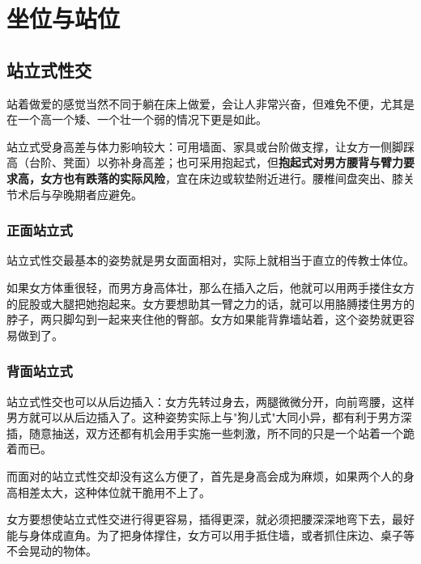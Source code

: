 \documentclass[12pt,UTF8]{ctexbook}
\begin{document}
\vspace{0.5em}
\section{坐位与站位}

\vspace{0.5em}
\subsection{站立式性交}

站着做爱的感觉当然不同于躺在床上做爱，会让人非常兴奋，但难免不便，尤其是在一个高一个矮、一个壮一个弱的情况下更是如此。

\vspace{0.5em}

站立式受身高差与体力影响较大：可用墙面、家具或台阶做支撑，让女方一侧脚踩高（台阶、凳面）以弥补身高差；也可采用抱起式，但\textbf{抱起式对男方腰背与臂力要求高，女方也有跌落的实际风险}，宜在床边或软垫附近进行。腰椎间盘突出、膝关节术后与孕晚期者应避免。

\subsubsection{正面站立式}

站立式性交最基本的姿势就是男女面面相对，实际上就相当于直立的传教士体位。

如果女方体重很轻，而男方身高体壮，那么在插入之后，他就可以用两手搂住女方的屁股或大腿把她抱起来。女方要想助其一臂之力的话，就可以用胳膊搂住男方的脖子，两只脚勾到一起来夹住他的臀部。女方如果能背靠墙站着，这个姿势就更容易做到了。

\vspace{0.5em}
\subsubsection{背面站立式}

站立式性交也可以从后边插入：女方先转过身去，两腿微微分开，向前弯腰，这样男方就可以从后边插入了。这种姿势实际上与"狗儿式"大同小异，都有利于男方深插，随意抽送，双方还都有机会用手实施一些刺激，所不同的只是一个站着一个跪着而已。

而面对的站立式性交却没有这么方便了，首先是身高会成为麻烦，如果两个人的身高相差太大，这种体位就干脆用不上了。

女方要想使站立式性交进行得更容易，插得更深，就必须把腰深深地弯下去，最好能与身体成直角。为了把身体撑住，女方可以用手抵住墙，或者抓住床边、桌子等不会晃动的物体。
\end{document}
